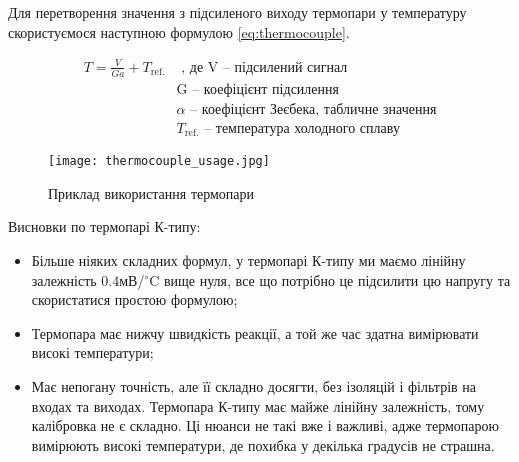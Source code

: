 Для перетворення значення з підсиленого виходу термопари у температуру скористуємося наступною формулою \ref{eq:thermocouple}.

\begin{equation}
    \label{eq:thermocouple}
    \begin{aligned}
        T = \frac{V}{Ga} + T_{\text{ref.}}
        & \text{ , де V -- підсилений сигнал} \\
        & \text{G -- коефіцієнт підсилення} \\
        & \text{$\alpha$ -- коефіцієнт Зеєбека, табличне значення} \\
        & \text{$T_{\text{ref.}}$ -- температура холодного сплаву}
    \end{aligned}
\end{equation}

\begin{figure}[ht]
    \centering
    \texttt{[image: thermocouple\_usage.jpg]}
    \caption{Приклад використання термопари}
    \label{fig:thermocouple_usage}
\end{figure}

Висновки по термопарі К-типу:

\begin{itemize}
    \item Більше ніяких складних формул, у термопарі К-типу ми маємо лінійну залежність 0.4мВ/$^\circ$C вище нуля, все що потрібно це підсилити цю напругу та скористатися простою формулою;
    \item Термопара має нижчу швидкість реакції, а той же час здатна вимірювати високі температури;
    \item Має непогану точність, але її складно досягти, без ізоляцій і фільтрів на входах та виходах. Термопара К-типу має майже лінійну залежність, тому калібровка не є складно. Ці нюанси не такі вже і важливі, адже термопарою вимірюють високі температури, де похибка у декілька градусів не страшна.\\
\end{itemize}
